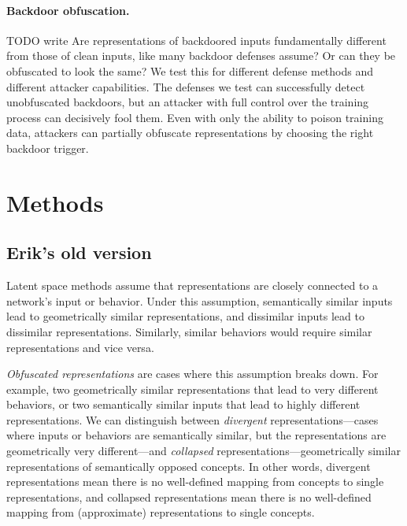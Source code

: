\documentclass{article}
\begin{document}
\paragraph{Backdoor obfuscation.} TODO write 
Are representations of backdoored inputs fundamentally different from those of clean inputs, like many backdoor defenses assume? Or can they be obfuscated to look the same? We test this for different defense methods and different attacker capabilities. The defenses we test can successfully detect unobfuscated backdoors, but an attacker with full control over the training process can decisively fool them. 
Even with only the ability to poison training data, attackers can partially obfuscate representations by choosing the right backdoor trigger. 



\section{Methods}
\subsection{Erik's old version}
Latent space methods assume that representations are closely connected to a network's input or behavior. Under this assumption, semantically similar inputs lead to geometrically similar representations, and dissimilar inputs lead to dissimilar representations. Similarly, similar behaviors would require similar representations and vice versa.

\emph{Obfuscated representations} are cases where this assumption breaks down. For example, two geometrically similar representations that lead to very different behaviors, or two semantically similar inputs that lead to highly different representations.
We can distinguish between \emph{divergent} representations---cases where inputs or behaviors are semantically similar, but the representations are geometrically very different---and \emph{collapsed} representations---geometrically similar representations of semantically opposed concepts.
In other words, divergent representations mean there is no well-defined mapping from concepts to single representations, and collapsed representations mean there is no well-defined mapping from (approximate) representations to single concepts. 
\end{document}

